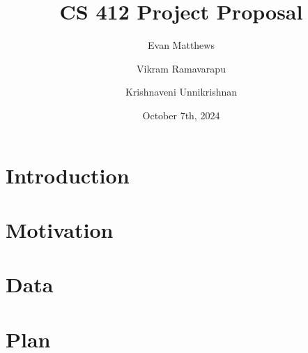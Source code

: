 \documentclass[12pt]{extarticle}
\title{CS 412 Project Proposal}
\author[1]{Evan Matthews}
\author[1]{Vikram Ramavarapu}
\author[1]{Krishnaveni Unnikrishnan}
\affil[1]{University of Illinois Urbana-Champaign}
\date{October 7th, 2024}
\begin{document}
\maketitle

\section{Introduction}

\section{Motivation}

\section{Data}

\section{Plan}



\end{document}
